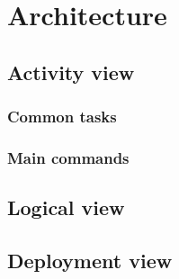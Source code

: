 \section{Architecture}

\subsection{Activity view}

\subsubsection{Common tasks}
\subsubsection{Main commands}

\subsection{Logical view}

\subsection{Deployment view}
